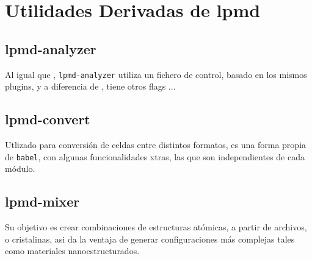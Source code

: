 \chapter{Utilidades Derivadas de lpmd}
\label{chap:utilidades}
\section{lpmd-analyzer}

Al igual que \lpmd, \verb|lpmd-analyzer| utiliza un fichero de control, basado en los mismos plugins, y a diferencia de \lpmd, tiene otros flags ...


\section{lpmd-convert}

Utlizado para conversi\'on de celdas entre distintos formatos, es una forma propia de \verb|babel|, con algunas funcionalidades xtras, las que son independientes de cada m\'odulo.

\section{lpmd-mixer}

Su objetivo es crear combinaciones de estructuras at\'omicas, a partir de archivos, o cristalinas, asi da la ventaja de generar configuraciones m\'as complejas tales como materiales nanoestructurados.